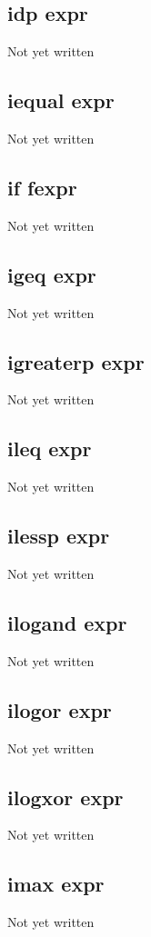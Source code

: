 \documentclass[a4paper,11pt]{article}
\begin{document}
\subsection{\ttfamily idp expr}
Not yet written

\subsection{\ttfamily iequal expr}
Not yet written

\subsection{\ttfamily if fexpr}
Not yet written

\subsection{\ttfamily igeq expr}
Not yet written

\subsection{\ttfamily igreaterp expr}
Not yet written

\subsection{\ttfamily ileq expr}
Not yet written

\subsection{\ttfamily ilessp expr}
Not yet written

\subsection{\ttfamily ilogand expr}
Not yet written

\subsection{\ttfamily ilogor expr}
Not yet written

\subsection{\ttfamily ilogxor expr}
Not yet written

\subsection{\ttfamily imax expr}
Not yet written
\end{document}
